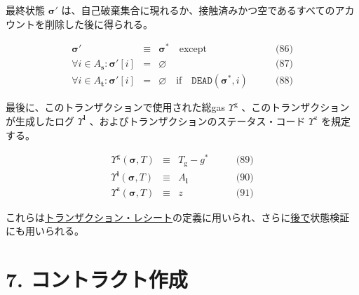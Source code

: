 \documentclass[
]{ltjsarticle}
\begin{document}
最終状態 \(\boldsymbol{\sigma}'\)
は、自己破棄集合に現れるか、接触済みかつ空であるすべてのアカウントを削除した後に得られる。

\protect\hypertarget{eq-86}{}{}\protect\hypertarget{eq-87}{}{}\protect\hypertarget{eq-88}{}{}

\[\begin{aligned}
\boldsymbol{\sigma}' & \equiv & \boldsymbol{\sigma}^{*} \quad \text{except} & \qquad \text{(86)} \\
\forall i \in A_{\mathbf{s}}: \boldsymbol{\sigma}'[i] & = & \varnothing & \qquad \text{(87)} \\
\forall i \in A_{\mathbf{t}}: \boldsymbol{\sigma}'[i] & = & \varnothing \quad\text{if}\quad \mathtt{DEAD}(\boldsymbol{\sigma}^{*}, i) & \qquad \text{(88)}
\end{aligned}\]

\hypertarget{tx_total_gas_used_Upsilon_pow_g}{}

\protect\hypertarget{Upsilon_pow_l}{}{}

\protect\hypertarget{tx_logs_Upsilon_pow_l}{}{}\protect\hypertarget{Upsilon_pow_z}{}{}

\protect\hypertarget{tx_status_Upsilon_pow_z}{}{}最後に、このトランザクションで使用された総gas
\(\Upsilon^{\mathrm{g}}\) 、このトランザクションが生成したログ
\(\Upsilon^{\mathbf{l}}\) 、およびトランザクションのステータス・コード
\(\Upsilon^{\mathrm{z}}\) を規定する。

\protect\hypertarget{eq-89}{}{}\protect\hypertarget{eq-90}{}{}\protect\hypertarget{eq-91}{}{}

\[\begin{aligned}
\Upsilon^{\mathrm{g}}(\boldsymbol{\sigma}, T) & \equiv & T_{\mathrm{g}} - g^{*} & \qquad \text{(89)} \\
\Upsilon^{\mathbf{l}}(\boldsymbol{\sigma}, T) & \equiv & A_{\mathbf{l}} & \qquad \text{(90)} \\
\Upsilon^{\mathrm{z}}(\boldsymbol{\sigma}, T) & \equiv & z & \qquad \text{(91)}
\end{aligned}\]

これらは\protect\hyperlink{Transaction_Receipt}{トランザクション・レシート}の定義に用いられ、さらに\protect\hyperlink{sigma_n}{後で}状態検証にも用いられる。

\protect\hypertarget{ch:create}{}{}

\hypertarget{ux30b3ux30f3ux30c8ux30e9ux30afux30c8ux4f5cux6210}{%
\section{7.
コントラクト作成}\label{ux30b3ux30f3ux30c8ux30e9ux30afux30c8ux4f5cux6210}}
\end{document}
